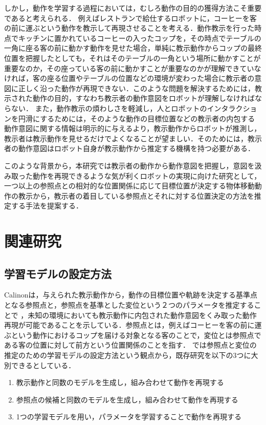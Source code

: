 しかし，動作を学習する過程においては，むしろ動作の目的の獲得方法こそ重要であると考えられる．
例えばレストランで給仕するロボットに，コーヒーを客の前に運ぶという動作を教示して再現させることを考える．動作教示を行った時点でキッチンに置かれているコーヒーの入ったコップを，その時点でテーブルの一角に座る客の前に動かす動作を見せた場合，単純に教示動作からコップの最終位置を把握したとしても，それはそのテーブルの一角という場所に動かすことが重要なのか，その座っている客の前に動かすことが重要なのかが理解できていなければ，客の座る位置やテーブルの位置などの環境が変わった場合に教示者の意図に正しく沿った動作が再現できない．このような問題を解決するためには，教示された動作の目的，すなわち教示者の動作意図をロボットが理解しなければならない．
また，動作教示の煩わしさを軽減し，人とロボットのインタラクションを円滑にするためには，そのような動作の目標位置などの教示者の内包する動作意図に関する情報は明示的に与えるより，教示動作からロボットが推測し，教示者は教示動作を見せるだけでよくなることが望ましい．そのためには，教示者の動作意図はロボット自身が教示動作から推定する機構を持つ必要がある．

このような背景から，本研究では教示者の動作から動作意図を把握し，意図を汲み取った動作を再現できるような気が利くロボットの実現に向けた研究として，一つ以上の参照点との相対的な位置関係に応じて目標位置が決定する物体移動動作の教示から，教示者の着目している参照点とそれに対する位置決定の方法を推定する手法を提案する．

\section{関連研究}

\subsection{学習モデルの設定方法}

Calinon\cite{calinon}は，与えられた教示動作から，動作の目標位置や軌跡を決定する基準点となる参照点と，参照点を基準とした変位という２つのパラメータを推定することで
，未知の環境においても教示動作に内包された動作意図をくみ取った動作再現が可能であることを示している．参照点とは，例えばコーヒーを客の前に運ぶという動作におけるコップを届ける対象となる客のことで，変位とは参照点である客の位置に対して前方という位置関係のことを指す．
\cite{calinon}では参照点と変位の推定のための学習モデルの設定方法という観点から，既存研究を以下の3つに大別できるとしている．

	\begin{enumerate}
		\item 教示動作と同数のモデルを生成し，組み合わせて動作を再現する
		\item 参照点の候補と同数のモデルを生成し，組み合わせて動作を再現する
		\item 1つの学習モデルを用い，パラメータを学習することで動作を再現する
	\end{enumerate}
	

